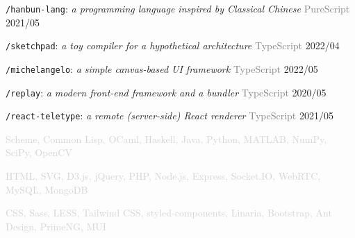 \documentclass[10pt]{article}
\begin{document}
\vspace{0.5em}
\texttt{/hanbun-lang}: \textit{a programming language inspired by Classical Chinese} \hfill \textcolor{gray}{PureScript}  2021/05

\vspace{0.5em}
\texttt{/sketchpad}: \textit{a toy compiler for a hypothetical architecture} \hfill \textcolor{gray}{TypeScript} 2022/04

\vspace{0.5em}
\texttt{/michelangelo}: \textit{a simple canvas-based UI framework} \hfill \textcolor{gray}{TypeScript}  2022/05

\vspace{0.5em}
\texttt{/replay}: \textit{a modern front-end framework and a bundler} \hfill \textcolor{gray}{TypeScript} 2020/05

\vspace{0.5em}
\texttt{/react-teletype}: \textit{a remote (server-side) React renderer} \hfill \textcolor{gray}{TypeScript} 2021/05

\vspace{2em}

\textcolor{lightgray}{Scheme, Common Lisp, OCaml, Haskell, Java, Python, MATLAB, NumPy, SciPy, OpenCV}

\textcolor{lightgray}{HTML, SVG, D3.js, jQuery, PHP, Node.js, Express, Socket.IO, WebRTC, MySQL, MongoDB}

\textcolor{lightgray}{CSS, Sass, LESS, Tailwind CSS, styled-components, Linaria, Bootstrap, Ant Design, PrimeNG, MUI}
\end{document}
